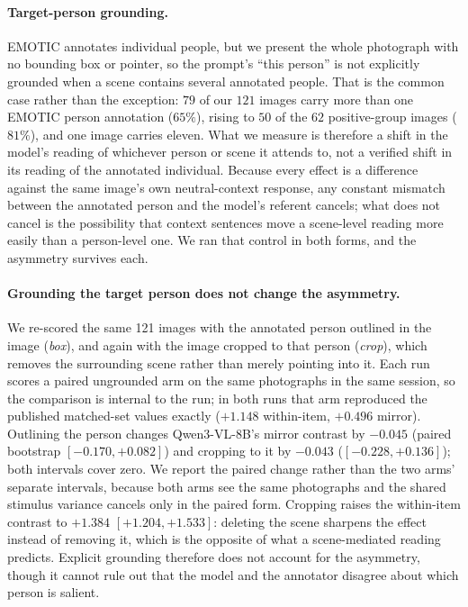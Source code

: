 \documentclass{article}
\newif\ifshort
\newcommand{\qwen}{Qwen3-VL-8B}
\begin{document}
\paragraph{Target-person grounding.}
EMOTIC annotates individual people, but we present the whole photograph with no bounding box or pointer, so the prompt's ``this person'' is not explicitly grounded when a scene contains several annotated people. That is the common case rather than the exception: $79$ of our $121$ images carry more than one EMOTIC person annotation ($65\%$), rising to $50$ of the $62$ positive-group images ($81\%$), and one image carries eleven. What we measure is therefore a shift in the model's reading of whichever person or scene it attends to, not a verified shift in its reading of the annotated individual. Because every effect is a difference against the same image's own neutral-context response, any constant mismatch between the annotated person and the model's referent cancels; what does not cancel is the possibility that context sentences move a scene-level reading more easily than a person-level one. \ifshort A cropped or explicitly marked target person is the control this design needs and we did not run it.\else We ran that control in both forms, and the asymmetry survives each.\fi

\ifshort\else
\paragraph{Grounding the target person does not change the asymmetry.}
We re-scored the same 121 images with the annotated person outlined in the image (\emph{box}), and again with the image cropped to that person (\emph{crop}), which removes the surrounding scene rather than merely pointing into it. Each run scores a paired ungrounded arm on the same photographs in the same session, so the comparison is internal to the run; in both runs that arm reproduced the published matched-set values exactly ($+1.148$ within-item, $+0.496$ mirror). Outlining the person changes \qwen{}'s mirror contrast by $-0.045$ (paired bootstrap $[-0.170,+0.082]$) and cropping to it by $-0.043$ ($[-0.228,+0.136]$); both intervals cover zero. We report the paired change rather than the two arms' separate intervals, because both arms see the same photographs and the shared stimulus variance cancels only in the paired form. Cropping raises the within-item contrast to $+1.384$ $[+1.204,+1.533]$: deleting the scene sharpens the effect instead of removing it, which is the opposite of what a scene-mediated reading predicts. Explicit grounding therefore does not account for the asymmetry, though it cannot rule out that the model and the annotator disagree about which person is salient.
\fi
\end{document}
